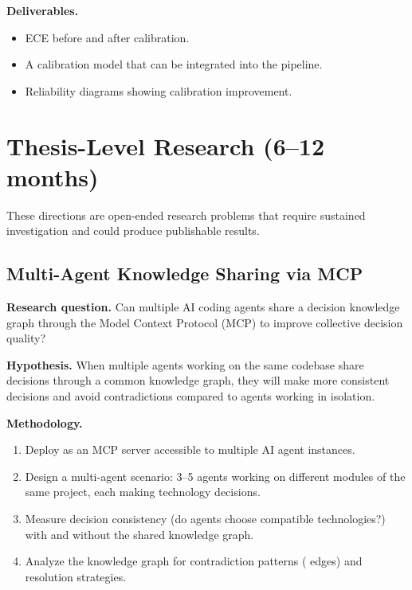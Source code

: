 \medskip\noindent\textbf{Deliverables.}

\begin{itemize}
    \item ECE before and after calibration.
    \item A calibration model that can be integrated into the pipeline.
    \item Reliability diagrams showing calibration improvement.
\end{itemize}


\section{Thesis-Level Research (6--12 months)}
\label{sec:future-thesis}

These directions are open-ended research problems that require sustained
investigation and could produce publishable results.


\subsection{Multi-Agent Knowledge Sharing via MCP}
\label{sec:future-multi-agent}

\noindent\textbf{Research question.}
Can multiple AI coding agents share a decision knowledge graph through the
Model Context Protocol (MCP) to improve collective decision quality?

\medskip\noindent\textbf{Hypothesis.}
When multiple agents working on the same codebase share decisions through
a common knowledge graph, they will make more consistent decisions and
avoid contradictions compared to agents working in isolation.

\medskip\noindent\textbf{Methodology.}

\begin{enumerate}
    \item Deploy \sysname{} as an MCP server accessible to multiple AI
          agent instances.
    \item Design a multi-agent scenario: 3--5 agents working on different
          modules of the same project, each making technology decisions.
    \item Measure decision consistency (do agents choose compatible
          technologies?) with and without the shared knowledge graph.
    \item Analyze the knowledge graph for contradiction patterns
          ( edges) and resolution strategies.
\end{enumerate}


